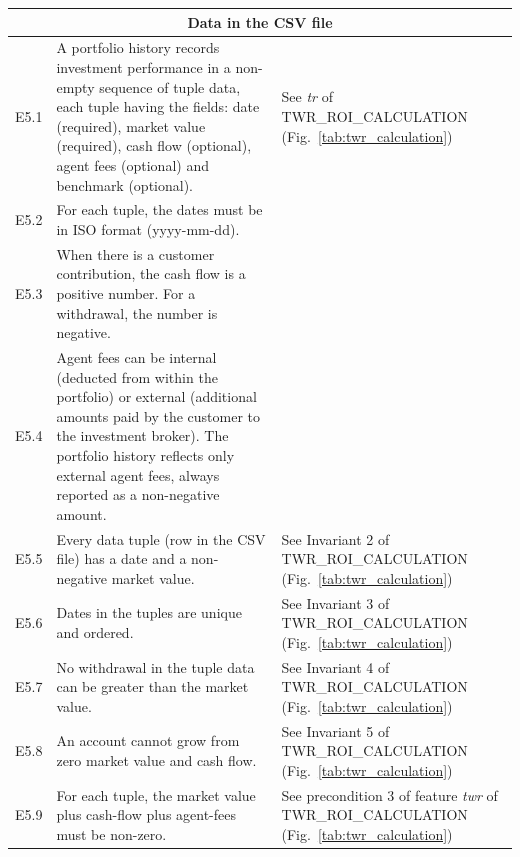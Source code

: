 \documentclass[runningheads,12pt]{article}
\begin{document}
{\begin{longtable}{|l|p{9cm}|p{5cm}|}
\hline
\end{longtable}

\centering
\begin{longtable}{|l|p{9cm}|p{5cm}|}

\hline
\multicolumn{3}{|c|}{\textbf{Data in the CSV file}} \\

\hline
E5.1 & A portfolio history records investment performance in a non-empty sequence of tuple data, each tuple having the fields: date (required), market value (required), cash flow (optional), agent fees (optional) and benchmark (optional). & See \textit{tr} of TWR\_ROI\_CALCULATION (Fig.~\ref{tab:twr_calculation})\\

\hline
E5.2 &  For each tuple, the dates must be in ISO format (yyyy-mm-dd). & \\

\hline
E5.3 & When there is a customer contribution, the cash flow is a positive number. For a withdrawal, the number is negative. & \\

\hline
E5.4 & Agent fees can be internal (deducted from within the portfolio) or external (additional amounts paid by the customer to the investment broker). The portfolio history reflects only external agent fees, always reported as a non-negative amount. & \\

\hline
E5.5 & Every data tuple (row in the CSV file) has a date and a non-negative market value. & See Invariant 2 of TWR\_ROI\_CALCULATION (Fig.~\ref{tab:twr_calculation})\\

\hline
E5.6 &  Dates in the tuples are unique and ordered. & See Invariant 3 of TWR\_ROI\_CALCULATION (Fig.~\ref{tab:twr_calculation})\\

\hline
E5.7 & No withdrawal in the tuple data can be greater than the market value. & See Invariant 4 of TWR\_ROI\_CALCULATION (Fig.~\ref{tab:twr_calculation})\\

\hline
E5.8 & An account cannot grow from zero market value and cash flow. & See Invariant 5 of TWR\_ROI\_CALCULATION (Fig.~\ref{tab:twr_calculation})\\

\hline
E5.9 &  For each tuple, the market value plus cash-flow plus agent-fees must be non-zero. & See precondition 3 of feature \textit{twr} of TWR\_ROI\_CALCULATION (Fig.~\ref{tab:twr_calculation})\\

\hline
\end{longtable}
}
\end{document}
